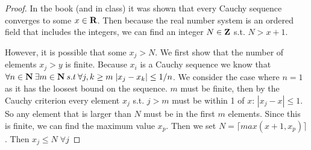 \documentclass[11pt]{article}
\begin{document}
\begin{proof}


In the book (and in class) it was shown that every Cauchy sequence converges to some $x \in \mathbf{R}$. Then because the real number system is an ordered field that includes the integers, we can find an integer $N \in \mathbf{Z}$ s.t. $N > x + 1$. 

However, it is possible that some $x_j > N$. We first show that the number of elements $x_j > y$ is finite. Because $x_i$ is a Cauchy sequence we know that $\forall n \in \mathbf{N} \: \exists m \in \mathbf{N} \: s.t \: \forall j,k \geq m \; |x_j - x_k| \leq 1/n$. We consider the case where $n = 1$ as it has the loosest bound on the sequence. $m$ must be finite, then by the Cauchy criterion every element $x_j$ s.t. $j > m$ must be within 1 of $x$: $|x_j - x| \leq 1$. So any element that is larger than $N$ must be in the first $m$ elements. Since this is finite, we can find the maximum value $x_p$. Then we set $N =  \lceil max(x+1, x_p) \rceil $. Then $x_j \leq N \; \forall j$ 

\end{proof}
\end{document}
